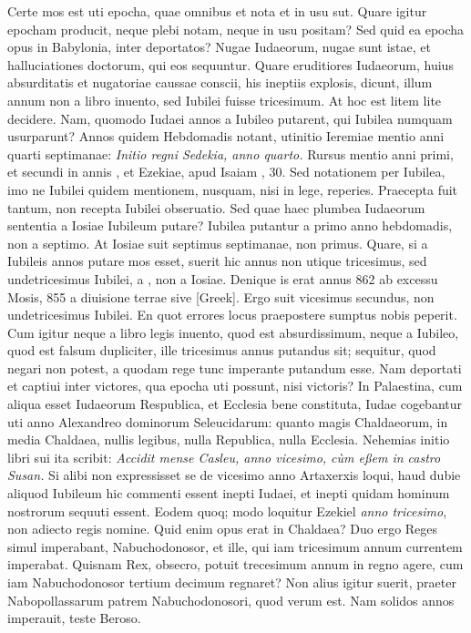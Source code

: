 Certe mos est uti epocha, quae omnibus et nota et in usu sut.
Quare
igitur epocham producit, neque plebi notam, neque in usu positam?
Sed quid ea epocha opus in Babylonia, inter deportatos?
Nugae Iudaeorum,
nugae sunt istae, et halluciationes doctorum, qui eos sequuntur.
Quare eruditiores Iudaeorum, huius absurditatis et nugatoriae
caussae conscii, his ineptiis explosis, dicunt, illum annum non a
libro inuento, sed Iubilei fuisse tricesimum.
At hoc est litem lite decidere.
Nam, quomodo Iudaei annos a Iubileo putarent, qui Iubilea
numquam usurparunt?
Annos quidem Hebdomadis notant, utinitio
 Ieremiae mentio anni quarti septimanae: \textit{Initio regni
Sedekia, anno quarto.}
Rursus mentio anni primi, et secundi in annis
, et  Ezekiae, apud Isaiam , 30.
Sed notationem
per Iubilea, imo ne Iubilei quidem mentionem, nusquam, nisi
in lege, reperies.
Praecepta fuit tantum, non recepta Iubilei obseruatio.
Sed quae haec plumbea Iudaeorum sententia a  Iosiae
Iubileum putare?
Iubilea putantur a primo anno hebdomadis, non
a septimo.
At  Iosiae suit septimus septimanae, non primus.
Quare, si a Iubileis annos putare mos esset, suerit hic annus non utique
tricesimus, sed undetricesimus Iubilei, a , non a
 Iosiae.
Denique is erat annus 862 ab excessu Mosis, 855 a
diuisione terrae sive \textgreek{[Greek]}.
Ergo suit vicesimus secundus, non
undetricesimus Iubilei.
En quot errores locus praepostere sumptus
nobis peperit.
Cum igitur neque a libro legis inuento, quod est absurdissimum,
neque a Iubileo, quod est falsum dupliciter, ille tricesimus
annus putandus sit; sequitur, quod negari non potest, a
quodam rege tunc imperante putandum esse.
Nam deportati et captiui
inter victores, qua epocha uti possunt, nisi victoris?
In Palaestina,
cum aliqua esset Iudaeorum Respublica, et Ecclesia bene constituta,
Iudae cogebantur uti anno Alexandreo dominorum Seleucidarum:
quanto magis Chaldaeorum, in media Chaldaea, nullis legibus,
nulla Republica, nulla Ecclesia.
Nehemias initio libri sui ita
scribit: \textit{Accidit mense Casleu, anno vicesimo, cùm eßem in castro Susan.}
Si alibi non expressisset se de vicesimo anno Artaxerxis loqui, haud
dubie aliquod Iubileum hic commenti essent inepti Iudaei, et inepti
quidam hominum nostrorum sequuti essent.
Eodem quoq; modo
loquitur Ezekiel \textit{anno tricesimo}, non adiecto regis nomine.
Quid enim opus erat in Chaldaea?
Duo ergo Reges simul imperabant,
Nabuchodonosor, et ille, qui iam tricesimum annum currentem
imperabat.
Quisnam Rex, obsecro, potuit trecesimum annum in regno
agere, cum iam Nabuchodonosor tertium decimum regnaret?
Non alius igitur suerit, praeter Nabopollassarum patrem Nabuchodonosori,
quod verum est.
Nam  solidos annos imperauit,
teste Beroso.

